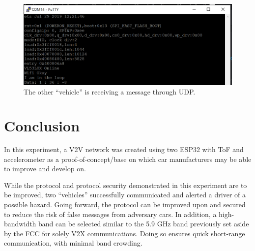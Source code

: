 \documentclass[conference]{IEEEtran}
\begin{document}
\begin{figure}[htbp]
\centerline{\includegraphics[width=\linewidth]{pics/term2.png}}
\caption{The other ``vehicle'' is receiving a message through UDP.}
\label{term2}
\end{figure}

\section{Conclusion}
In this experiment, a V2V network was created using two ESP32 with ToF and
accelerometer as a proof-of-concept/base on which car manufacturers may be able
to improve and develop on.

While the protocol and protocol security demonstrated in this experiment are to
be improved, two ``vehicles'' successfully communicated and alerted a driver
of a possible hazard. Going forward, the protocol can be improved upon and 
secured to reduce the risk of false messages from adversary cars. In addition, 
a high-bandwidth band can be selected similar to the 5.9 GHz band previously
set aside by the FCC for solely V2X communications. Doing so ensures quick
short-range communication, with minimal band crowding.




\end{document}
